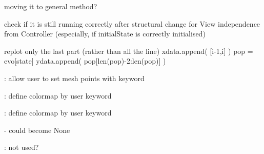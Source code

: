 \begin{DoxyRefList}
moving it to general method?  
\item[\label{todo__todo000065}%
\Hypertarget{todo__todo000065}%
Global \hyperlink{class_mu_mo_t_1_1_mu_mo_t_1_1_mu_mo_t_s_s_a_view_a51d421aacb4cd83af5f1c2e60c3dff9c}{Mu\+Mo\+T\+S\+S\+A\+View.\+\_\+single\+Run} (self, random\+Seed)]check if it is still running correctly after structural change for View independence from Controller (especially, if initial\+State is correctly initialised)  
\item[\label{todo__todo000069}%
\Hypertarget{todo__todo000069}%
Global \hyperlink{class_mu_mo_t_1_1_mu_mo_t_1_1_mu_mo_t_s_s_a_view_ae8c8d7969b8ab8f31df9d1d1d10eabb9}{Mu\+Mo\+T\+S\+S\+A\+View.\+\_\+visualisation\+Type} ]replot only the last part (rather than all the line) xdata.\+append( \mbox{[}i-\/1,i\mbox{]} ) pop = evo\mbox{[}state\mbox{]} ydata.\+append( pop\mbox{[}len(pop)-\/2\+:len(pop)\mbox{]} )  
\item[\label{todo__todo000041}%
\Hypertarget{todo__todo000041}%
Global \hyperlink{class_mu_mo_t_1_1_mu_mo_t_1_1_mu_mo_tstream_view_ac83a924ad62a2461d65b5c9bf9d27453}{Mu\+Mo\+Tstream\+View.\+\_\+show\+Fixed\+Points} ]\+: allow user to set mesh points with keyword 

\+: define colormap by user keyword 

\+: define colormap by user keyword  
\item[\label{todo__todo000027}%
\Hypertarget{todo__todo000027}%
Global \hyperlink{class_mu_mo_t_1_1_mu_mo_t_1_1_mu_mo_tview_a15f56ca9811d1e67d721fa64f9b0dc1e}{Mu\+Mo\+Tview.\+\_\+controller} ]-\/ could become None  
\item[\label{todo__todo000028}%
\Hypertarget{todo__todo000028}%
Global \hyperlink{class_mu_mo_t_1_1_mu_mo_t_1_1_mu_mo_tview_a590db9d889a22b57be41475d83d4d453}{Mu\+Mo\+Tview.\+\_\+plot\+Limits} ]\+: not used? 
\end{DoxyRefList}
